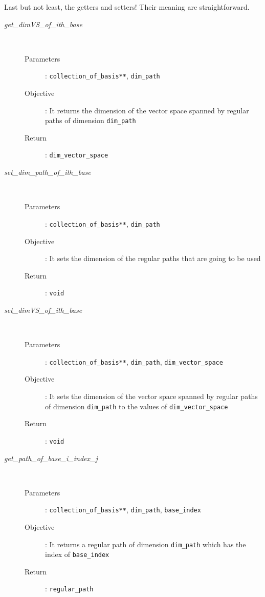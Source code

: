 \documentclass[11pt,a4paper]{article}
\begin{document}
Last but not least, the getters and setters! Their meaning are straightforward.
\begin{description}
	\item [\textit{get\_dimVS\_of\_ith\_base}] \hfill \\[-0.5cm]
		\begin{description}
			\item [Parameters]: \texttt{collection\_of\_basis**}, \texttt{dim\_path}
			\item [Objective]: It returns the dimension of the vector space
				spanned by regular paths of dimension \texttt{dim\_path}
			\item [Return]: \texttt{dim\_vector\_space}
		\end{description}
	\item [\textit{set\_dim\_path\_of\_ith\_base}] \hfill \\[-0.5cm]
		\begin{description}
			\item [Parameters]: \texttt{collection\_of\_basis**}, \texttt{dim\_path}
			\item [Objective]: It sets the dimension of the regular paths that are going
				to be used
			\item [Return]: \texttt{void}
		\end{description}
	\item [\textit{set\_dimVS\_of\_ith\_base}] \hfill \\[-0.5cm]
		\begin{description}
			\item [Parameters]: \texttt{collection\_of\_basis**}, \texttt{dim\_path},
				\texttt{dim\_vector\_space}
			\item [Objective]: It sets the dimension of the vector space
				spanned by regular paths of dimension \texttt{dim\_path} to the
				values of \texttt{dim\_vector\_space}
			\item [Return]: \texttt{void}
		\end{description}
	\item [\textit{get\_path\_of\_base\_i\_index\_j}] \hfill \\[-0.5cm]
		\begin{description}
			\item [Parameters]: \texttt{collection\_of\_basis**}, \texttt{dim\_path},
				\texttt{base\_index}
			\item [Objective]: It returns a regular path of dimension 
				\texttt{dim\_path} which has the index of \texttt{base\_index}
			\item [Return]: \texttt{regular\_path}

\end{description}
\end{description}
\end{document}

